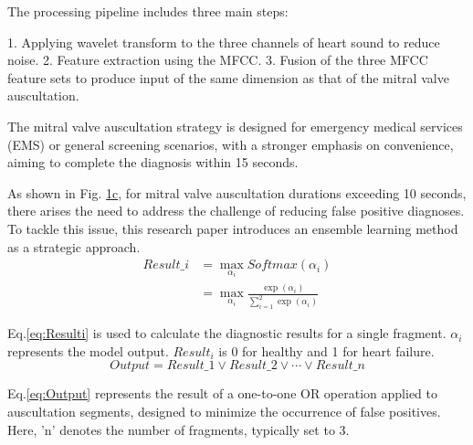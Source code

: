 The processing pipeline includes three main steps:

1. Applying wavelet transform to the three channels of heart sound to reduce noise.
2. Feature extraction using the MFCC.
3. Fusion of the three MFCC feature sets to produce input of the same dimension as that of the mitral valve auscultation.

The mitral valve auscultation strategy is designed for emergency medical services (EMS) or general screening scenarios, with a stronger emphasis on convenience, aiming to complete the diagnosis within 15 seconds.

As shown in Fig. \hyperref[FIG:Methodology]{1c}, for mitral valve auscultation durations exceeding 10 seconds, there arises the need to address the challenge of reducing false positive diagnoses. To tackle this issue, this research paper introduces an ensemble learning method as a strategic approach.
\begin{equation}
\begin{split}
Result\_i&= \max \limits_{\alpha_{i}}Softmax(\alpha_{i}) \\
&= \max \limits_{\alpha_{i}}\frac{\exp(\alpha_{i})}{\sum_{i=1}^{2} \exp(\alpha_{i})}
	\label{eq:Resulti}
\end{split}
\end{equation} 

Eq.\ref{eq:Resulti} is used to calculate the diagnostic results for a single fragment. $\alpha_{i}$ represents the model output. $Result_{i}$ is 0 for healthy and 1 for heart failure.
\begin{equation}
Output = Result\_1 \lor Result\_2 \lor \cdots \lor Result\_n
\label{eq:Output}
\end{equation} 

Eq.\ref{eq:Output} represents the result of a one-to-one OR operation applied to auscultation segments, designed to minimize the occurrence of false positives. Here, 'n' denotes the number of fragments, typically set to 3.